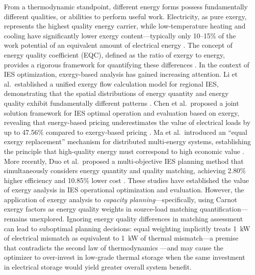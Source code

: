 From a thermodynamic standpoint, different energy forms possess fundamentally different qualities, or abilities to perform useful work. Electricity, as pure exergy, represents the highest quality energy carrier, while low-temperature heating and cooling have significantly lower exergy content---typically only 10--15\% of the work potential of an equivalent amount of electrical energy \cite{dincer2001energy,bejan2016advanced,hu2020eqc}. The concept of energy quality coefficient (EQC), defined as the ratio of exergy to energy, provides a rigorous framework for quantifying these differences \cite{chen2022energy,ma2023exergyflex}. In the context of IES optimization, exergy-based analysis has gained increasing attention. Li et al.\ established a unified exergy flow calculation model for regional IES, demonstrating that the spatial distributions of energy quantity and energy quality exhibit fundamentally different patterns \cite{li2022exergyflow}. Chen et al.\ proposed a joint solution framework for IES optimal operation and evaluation based on exergy, revealing that energy-based pricing underestimates the value of electrical loads by up to 47.56\% compared to exergy-based pricing \cite{chen2024joint}. Ma et al.\ introduced an ``equal exergy replacement'' mechanism for distributed multi-energy systems, establishing the principle that high-quality energy must correspond to high economic value \cite{ma2023exergyflex}. More recently, Duo et al.\ proposed a multi-objective IES planning method that simultaneously considers energy quantity and quality matching, achieving 2.80\% higher efficiency and 10.85\% lower cost \cite{duo2025matching}. These studies have established the value of exergy analysis in IES operational optimization and evaluation. However, the application of exergy analysis to \emph{capacity planning}---specifically, using Carnot exergy factors as energy quality weights in source-load matching quantification---remains unexplored. Ignoring energy quality differences in matching assessment can lead to suboptimal planning decisions: equal weighting implicitly treats 1~kW of electrical mismatch as equivalent to 1~kW of thermal mismatch---a premise that contradicts the second law of thermodynamics \cite{moran2014fundamentals}---and may cause the optimizer to over-invest in low-grade thermal storage when the same investment in electrical storage would yield greater overall system benefit.

